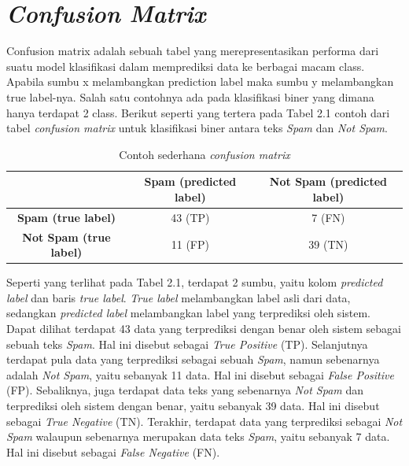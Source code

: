 \section{\emph{Confusion Matrix}}
\label{sec:confmatrix}

Confusion matrix adalah sebuah tabel yang merepresentasikan performa dari suatu model klasifikasi dalam memprediksi data ke berbagai macam class. Apabila sumbu x melambangkan prediction label maka sumbu y melambangkan true label-nya. Salah satu contohnya ada pada klasifikasi biner yang dimana hanya terdapat 2 class. Berikut seperti yang tertera pada Tabel 2.1 contoh dari tabel \emph{confusion matrix} untuk klasifikasi biner antara teks \emph{Spam} dan \emph{Not Spam}.

\begin{longtable}[c]{|c|c|c|}
	\caption{Contoh sederhana \emph{confusion matrix}}
	\label{tab:my-table}\\
	\hline
	& \textbf{Spam (predicted label)} & \textbf{Not Spam (predicted label)} \\ \hline
	\endfirsthead
	\endhead
	\textbf{Spam (true label)}     & 43 (TP)                         & 7 (FN)                              \\ \hline
	\textbf{Not Spam (true label)} & 11 (FP)                         & 39 (TN)                             \\ \hline
\end{longtable}

Seperti yang terlihat pada Tabel 2.1, terdapat 2 sumbu, yaitu kolom \emph{predicted label} dan baris \emph{true label}. \emph{True label} melambangkan label asli dari data, sedangkan \emph{predicted label} melambangkan label yang terprediksi oleh sistem. Dapat dilihat terdapat 43 data yang terprediksi dengan benar oleh sistem sebagai sebuah teks \emph{Spam}. Hal ini disebut sebagai \emph{True Positive} (TP). Selanjutnya terdapat pula data yang terprediksi sebagai sebuah \emph{Spam}, namun sebenarnya adalah \emph{Not Spam}, yaitu sebanyak 11 data. Hal ini disebut sebagai \emph{False Positive} (FP). Sebaliknya, juga terdapat data teks yang sebenarnya \emph{Not Spam} dan terprediksi oleh sistem dengan benar, yaitu sebanyak 39 data. Hal ini disebut sebagai \emph{True Negative} (TN). Terakhir, terdapat data yang terprediksi sebagai \emph{Not Spam} walaupun sebenarnya merupakan data teks \emph{Spam}, yaitu sebanyak 7 data. Hal ini disebut sebagai \emph{False Negative} (FN).